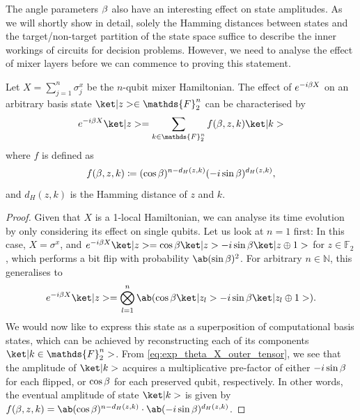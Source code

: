 The angle parameters $\beta$ also have an interesting effect on state amplitudes. As we will shortly show in detail, solely the Hamming distances between states and the target/non-target partition of the state space suffice to describe the inner workings of \QAOA circuits for decision problems. However, we need to analyse the 
effect of mixer layers before we can commence to proving this
statement.

\begin{lemma}
  \label{thm:mixer_amplitudes_f}
    Let $X = \sum_{j = 1}^n \sigma_j^x$ be the $n$-qubit mixer Hamiltonian. The effect of $e^{-i \beta X}$ on an arbitrary basis state $\ket|z> \in \mathds{F}_2^n$ can be characterised by
  \begin{equation}
    e^{-i \mangle X} \ket|z> = \sum_{k \in \mathds{F}_2^n} f(\mangle, z, k) \ket|k>
  \end{equation}
  where $f$ is defined as 
  \begin{equation}
    \label{eq:f_with_states}
    f(\beta, z, k) \coloneqq (\cos \beta)^{n - d_H (z,k)} (-i \sin \beta)^{d_H (z,k)},
  \end{equation}
  and $d_H(z,k)$ is the Hamming distance of $z$ and $k$.
\end{lemma}

\begin{proof}
  Given that $X$ is a 1-local Hamiltonian, we can analyse its time evolution by only considering its effect on single qubits. Let us look at $n=1$ first: In this case, $X = \sigma^x$, and $e^{-i \mangle X} \ket|z> = \cos \mangle \ket|z> - i \sin \mangle \ket|z \oplus 1>$ for $z \in \mathds{F}_2$, which performs a bit flip with probability $\ab(\sin \mangle)^2$. For arbitrary $n \in \mathds{N}$, this generalises to
%
\begin{equation}
  \label{eq:exp_theta_X_outer_tensor}
  e^{-i \mangle X} \ket|z> = \bigotimes_{l = 1}^n \ab(\cos \mangle \ket|z_l> - i \sin \mangle \ket|z_l \oplus 1>).
\end{equation}
%
    We would now like to express this state as a superposition of computational basis states, which can be achieved by reconstructing each of its components $\ket|k \in \mathds{F}_2^n>$.  From \cref{eq:exp_theta_X_outer_tensor}, we see that the amplitude of $\ket|k>$ acquires a multiplicative pre-factor of either $-i\sin \beta$ for each flipped, or $\cos \beta$ for each preserved qubit, respectively. In other words, the eventual amplitude of state $\ket|k>$ is given by $f(\mangle, z, k) = \ab(\cos \mangle)^{n - d_H (z, k)} \cdot\ab(-i \sin \mangle)^{d_H (z, k)}$.
\end{proof}

